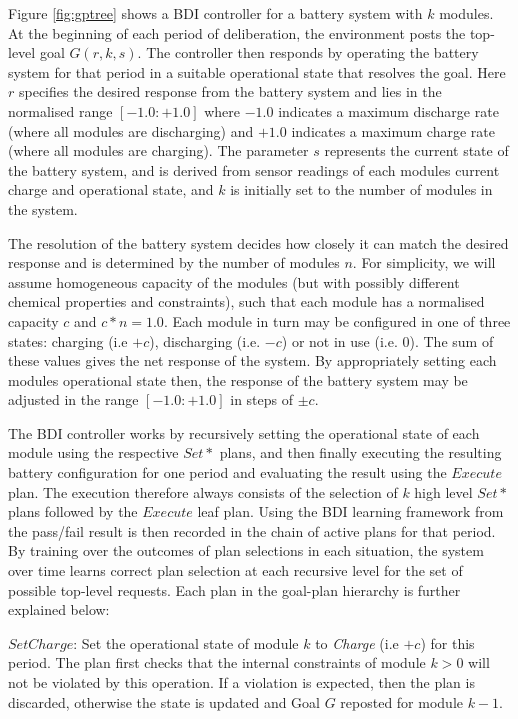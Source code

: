 Figure \ref{fig:gptree} shows a BDI controller for a battery system with $k$ modules. At the beginning of each period of deliberation, the environment posts the top-level goal $G(r,k,s)$. The controller then responds by operating the battery system for that period in a suitable operational state that resolves the goal. Here $r$ specifies the desired response from the battery system and lies in the normalised range $[-1.0:+1.0]$ where $-1.0$ indicates a maximum discharge rate (where all modules are discharging) and $+1.0$ indicates a maximum charge rate (where all modules are charging). The parameter $s$ represents the current state of the battery system, and is derived from sensor readings of each modules current charge and operational state, and $k$ is initially set to the number of modules in the system. 

The resolution of the battery system decides how closely it can match the desired response and is determined by the number of modules $n$. For simplicity, we will assume homogeneous capacity of the modules (but with possibly different chemical properties and constraints), such that each module has a normalised capacity $c$ and $c*n=1.0$. Each module in turn may be configured in one of three states: charging (i.e $+c$), discharging (i.e. $-c$) or not in use (i.e. $0$). The sum of these values gives the net response of the system. By appropriately setting each modules operational state then, the response of the battery system may be adjusted in the range $[-1.0:+1.0]$ in steps of $\pm c$.

The BDI controller works by recursively setting the operational state of each module using the respective $Set*$ plans, and then finally executing the resulting battery configuration for one period and evaluating the result using the $Execute$ plan. The execution therefore always consists of the selection of $k$ high level $Set*$ plans followed by the $Execute$ leaf plan. Using the BDI learning framework from \cite{Singh:RAS10} the pass/fail result is then recorded in the chain of active plans for that period. By training over the outcomes of plan selections in each situation, the system over time learns correct plan selection at each recursive level for the set of possible top-level requests. Each plan in the goal-plan hierarchy is further explained below:

$SetCharge$: Set the operational state of module $k$ to {\em Charge} (i.e $+c$) for this period. The plan first checks that the internal constraints of module $k>0$ will not be violated by this operation. If a violation is expected, then the plan is discarded, otherwise the state is updated and Goal $G$ reposted for module $k-1$.

